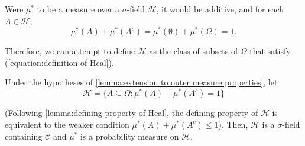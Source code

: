Were \(\mu^*\) to be a measure over a \(\sigma\)-field \(\mathcal{H}\), it would be
additive, and for each \(A\in\mathcal{H}\),
\begin{equation}\label{equation:definition of
Hcal} \mu^*(A)+\mu^*(A^c)=\mu^*(\emptyset)+\mu^*(\Omega)=1.
\end{equation}

Therefore, we can attempt to define \(\mathcal{H}\) as the class of subsets of
\(\Omega\) that satisfy (\ref{equation:definition of Hcal}).

\begin{thrm}\label{theorem:extension to Hcal} Under the hypotheses of
\cref{lemma:extension to outer measure properties}, let
	\[\mathcal{H}=\{A\subseteq\Omega:\mu^*(A)+\mu^*(A^c)=1\}\]
	
	(Following \cref{lemma:defining property of Hcal}, the defining property of
\(\mathcal{H}\) is equivalent to the weaker condition \(\mu^*(A)+\mu^*(A^c)\leq1\)).
Then, \(\mathcal{H}\) is a \(\sigma\)-field containing \(\mathcal{C}\) and \(\mu^*\) is a
probability measure on \(\mathcal{H}\).
\end{thrm}
